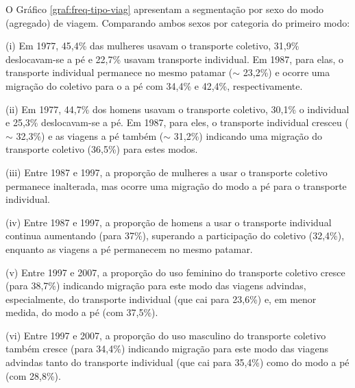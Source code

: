 O Gráfico \ref{graf:freq-tipo-viag} apresentam a segmentação por sexo do modo (agregado) de viagem.
Comparando ambos sexos por categoria do primeiro modo:
\begin{compactitem}[]
\item (i) Em 1977, 45,4\% das mulheres usavam o transporte coletivo, 31,9\% deslocavam-se a pé e 22,7\% usavam transporte individual. Em 1987, para elas, o transporte individual permanece no mesmo patamar ($\sim$ 23,2\%) e ocorre uma migração do coletivo para o a pé com 34,4\% e 42,4\%, respectivamente.
\item (ii) Em 1977, 44,7\% dos homens usavam o transporte coletivo, 30,1\% o individual e 25,3\% deslocavam-se a pé. Em 1987, para eles, o transporte individual cresceu ($\sim$ 32,3\%) e as viagens a pé também ($\sim$ 31,2\%) indicando uma migração do transporte coletivo (36,5\%) para estes modos.
\item (iii) Entre 1987 e 1997, a proporção de mulheres a usar o transporte coletivo permanece inalterada, mas ocorre uma migração do modo a pé para o transporte individual.
\item (iv) Entre 1987 e 1997, a proporção de homens a usar o transporte individual continua aumentando (para 37\%), superando a participação do coletivo (32,4\%), enquanto as viagens a pé permanecem no mesmo patamar.
\item (v) Entre 1997 e 2007, a proporção do uso feminino do transporte coletivo cresce (para 38,7\%) indicando migração para este modo das viagens advindas, especialmente, do transporte individual (que cai para 23,6\%) e, em menor medida, do modo a pé (com 37,5\%). 
\item (vi) Entre 1997 e 2007, a proporção do uso masculino do transporte coletivo também cresce (para 34,4\%) indicando migração para este modo das viagens advindas tanto do transporte individual (que cai para 35,4\%) como do modo a pé (com 28,8\%).
\end{compactitem}

